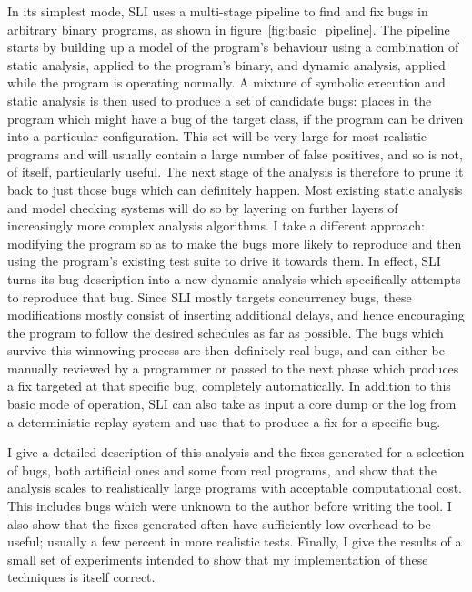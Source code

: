 In its simplest mode, SLI uses a multi-stage pipeline to find and fix
bugs in arbitrary binary programs, as shown in
figure~\ref{fig:basic_pipeline}.  The pipeline starts by building up a
model of the program's behaviour using a combination of static
analysis, applied to the program's binary, and dynamic analysis,
applied while the program is operating normally.  A mixture of
symbolic execution and static analysis is then used to produce a set
of candidate bugs: places in the program which might have a bug of the
target class, if the program can be driven into a particular
configuration.  This set will be very large for most realistic
programs and will usually contain a large number of false positives,
and so is not, of itself, particularly useful.  The next stage of the
analysis is therefore to prune it back to just those bugs which can
definitely happen.  Most existing static analysis and model checking
systems will do so by layering on further layers of increasingly more
complex analysis algorithms.  I take a different approach: modifying
the program so as to make the bugs more likely to reproduce and then
using the program's existing test suite to drive it towards them.  In
effect, SLI turns its bug description into a new dynamic analysis
which specifically attempts to reproduce that bug.  Since SLI mostly
targets concurrency bugs, these modifications mostly consist of
inserting additional delays, and hence encouraging the program to
follow the desired schedules as far as possible.  The bugs which
survive this winnowing process are then definitely real bugs, and can
either be manually reviewed by a programmer or passed to the next
phase which produces a fix targeted at that specific bug, completely
automatically.  In addition to this basic mode of operation, SLI can
also take as input a core dump or the log from a deterministic replay
system and use that to produce a fix for a specific bug.

I give a detailed description of this analysis and the fixes generated
for a selection of bugs, both artificial ones and some from real
programs, and show that the analysis scales to realistically large
programs with acceptable computational cost.  This includes bugs which
were unknown to the author before writing the tool.  I also show
that the fixes generated often have sufficiently low overhead to be
useful; usually a few percent in more realistic tests.  Finally, I
give the results of a small set of experiments intended to show that
my implementation of these techniques is itself correct.

